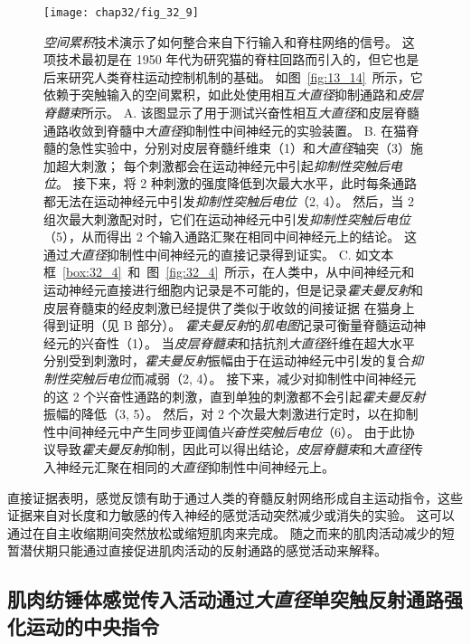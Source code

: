 \begin{figure}[htbp]
	\centering
	\texttt{[image: chap32/fig\_32\_9]}
	\caption{\textit{空间累积}技术演示了如何整合来自下行输入和脊柱网络的信号。
	这项技术最初是在 1950 年代为研究猫的脊柱回路而引入的，但它也是后来研究人类脊柱运动控制机制的基础。
	如图~\ref{fig:13_14}~所示，它依赖于突触输入的空间累积，如此处使用相互\textit{大直径}抑制通路和\textit{皮层脊髓束}所示。
	A. 该图显示了用于测试兴奋性相互\textit{大直径}和皮层脊髓通路收敛到脊髓中\textit{大直径}抑制性中间神经元的实验装置。
	B. 在猫脊髓的急性实验中，分别对皮层脊髓纤维束（1）和\textit{大直径}轴突（3）施加超大刺激；
	每个刺激都会在运动神经元中引起\textit{抑制性突触后电位}。
	接下来，将 2 种刺激的强度降低到次最大水平，此时每条通路都无法在运动神经元中引发\textit{抑制性突触后电位}（2, 4）。
	然后，当 2 组次最大刺激配对时，它们在运动神经元中引发\textit{抑制性突触后电位}（5），从而得出 2 个输入通路汇聚在相同中间神经元上的结论。
	这通过\textit{大直径}抑制性中间神经元的直接记录得到证实。
	C. 如文本框~\ref{box:32_4}~和~图~\ref{fig:32_4}~所示，在人类中，从中间神经元和运动神经元直接进行细胞内记录是不可能的，但是记录\textit{霍夫曼反射}和皮层脊髓束的经皮刺激已经提供了类似于收敛的间接证据 在猫身上得到证明（见 B 部分）。
	\textit{霍夫曼反射}的\textit{肌电图}记录可衡量脊髓运动神经元的兴奋性（1）。
	当\textit{皮层脊髓束}和拮抗剂\textit{大直径}纤维在超大水平分别受到刺激时，\textit{霍夫曼反射}振幅由于在运动神经元中引发的复合\textit{抑制性突触后电位}而减弱（2, 4）。
	接下来，减少对抑制性中间神经元的这 2 个兴奋性通路的刺激，直到单独的刺激都不会引起\textit{霍夫曼反射}振幅的降低（3, 5）。
	然后，对 2 个次最大刺激进行定时，以在抑制性中间神经元中产生同步亚阈值\textit{兴奋性突触后电位}（6）。
	由于此协议导致\textit{霍夫曼反射}抑制，因此可以得出结论，\textit{皮层脊髓束}和\textit{大直径}传入神经元汇聚在相同的\textit{大直径}抑制性中间神经元上。}
	\label{fig:32_9}
\end{figure}


直接证据表明，感觉反馈有助于通过人类的脊髓反射网络形成自主运动指令，这些证据来自对长度和力敏感的传入神经的感觉活动突然减少或消失的实验。
这可以通过在自主收缩期间突然放松或缩短肌肉来完成。
随之而来的肌肉活动减少的短暂潜伏期只能通过直接促进肌肉活动的反射通路的感觉活动来解释。



\subsection{肌肉纺锤体感觉传入活动通过\textit{大直径}单突触反射通路强化运动的中央指令}

